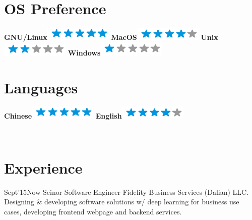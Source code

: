 \documentclass[]{friggeri-cv}
\begin{document}
\begin{aside}
  \section{OS Preference}
    \textbf{GNU/Linux}\includegraphics[scale=0.40]{img/5stars.png}
    \textbf{MacOS}\includegraphics[scale=0.40]{img/4stars.png}
    \textbf{Unix}\includegraphics[scale=0.40]{img/2stars.png}
    \textbf{Windows}\includegraphics[scale=0.40]{img/1stars.png}
    ~
  \section{Languages}
    \textbf{Chinese}\includegraphics[scale=0.40]{img/5stars.png}
    \textbf{English}\includegraphics[scale=0.40]{img/4stars.png}
    ~
\end{aside}
~
\section{Experience}
\begin{entrylist}
  \entry
    {Sept'15}{Now}
    {Seinor Software Engineer}
    {Fidelity Business Services (Dalian) LLC.}
    {Designing \& developing software solutions w/ deep learning for business use cases,
      developing frontend webpage and backend services. }
\end{entrylist}
~
\end{document}

